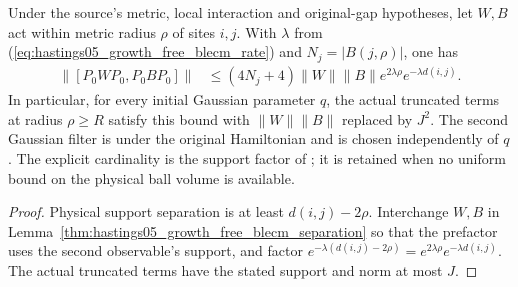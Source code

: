 \begin{lemma}
    \label{thm:hastings05_growth_free_metric_blecm}
    \leanok
    Under the source's metric, local interaction and original-gap
    hypotheses, let $W,B$ act within metric radius $\rho$ of sites $i,j$.
    With $\lambda$ from (\ref{eq:hastings05_growth_free_blecm_rate}) and
    $N_j=|B(j,\rho)|$, one has
    \begin{align}
        \|[P_0WP_0,P_0BP_0]\|
         & \le(4N_j+4)\|W\|\|B\|e^{2\lambda\rho}e^{-\lambda d(i,j)}.
        \label{eq:hastings05_growth_free_metric_blecm}
    \end{align}
    In particular, for every initial Gaussian parameter $q$, the actual
    truncated terms at radius $\rho\ge R$ satisfy this bound with
    $\|W\|\|B\|$ replaced by $J^2$. The second Gaussian filter is under
    the original Hamiltonian and is chosen independently of $q$.
    The explicit cardinality is the support factor of
    \cite[eqs.~(lc), (blecm), lines 1548--1601]{Hastings2006Solving}; it is
    retained when no uniform bound on the physical ball volume is available.
\end{lemma}
\begin{proof}\leanok
    Physical support separation is at least $d(i,j)-2\rho$.
    Interchange $W,B$ in
    Lemma~\ref{thm:hastings05_growth_free_blecm_separation} so that the
    prefactor uses the second observable's support, and factor
    $e^{-\lambda(d(i,j)-2\rho)}=e^{2\lambda\rho}e^{-\lambda d(i,j)}$.
    The actual truncated terms have the stated support and norm at most $J$.
\end{proof}
